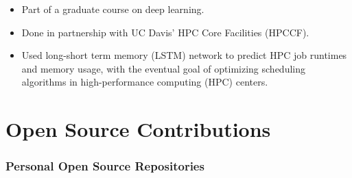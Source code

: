 \documentclass{resume}
\begin{document}
\begin{description}
        \begin{itemize}
        \item Part of a graduate course on deep learning.
            
        \item Done in partnership with UC Davis' HPC Core Facilities
          (HPCCF).

        \item Used long-short term memory (LSTM) network to predict
          HPC job runtimes and memory usage, with the eventual goal of
          optimizing scheduling algorithms in high-performance
          computing (HPC) centers.
        \end{itemize}
\end{description}


\section*{Open Source Contributions}

\begin{description}



\end{description}

\subsubsection*{Personal Open Source Repositories}
\end{document}
